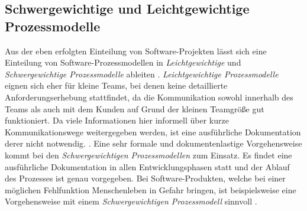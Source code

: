 \subsection{Schwergewichtige und Leichtgewichtige Prozessmodelle}

Aus der eben erfolgten Einteilung von Software-Projekten lässt sich eine Einteilung von Software-Prozessmodellen in \textit{Leichtgewichtige} und \textit{Schwergewichtige Prozessmodelle} ableiten \cite{Hanser2010}. \newline
\textit{Leichtgewichtige Prozessmodelle} eignen sich eher für kleine Teams, bei denen keine detaillierte Anforderungserhebung stattfindet, da die Kommunikation sowohl innerhalb des Teams als auch mit dem Kunden auf Grund der kleinen Teamgröße gut funktioniert. Da viele Informationen hier informell über kurze Kommunikationswege weitergegeben werden, ist eine ausführliche Dokumentation derer nicht notwendig. \cite{Hanser2010}. \newline
Eine sehr formale und dokumentenlastige Vorgehensweise kommt bei den \textit{Schwergewichtigen Prozessmodellen} zum Einsatz. Es findet eine ausführliche Dokumentation in allen Entwicklungsphasen statt und der Ablauf des Prozesses ist genau vorgegeben. Bei Software-Produkten, welche bei einer möglichen Fehlfunktion Menschenleben in Gefahr bringen, ist beispielsweise eine Vorgehensweise mit einem \textit{Schwergewichtigen Prozessmodell} sinnvoll \cite{Hanser2010}. \newline














